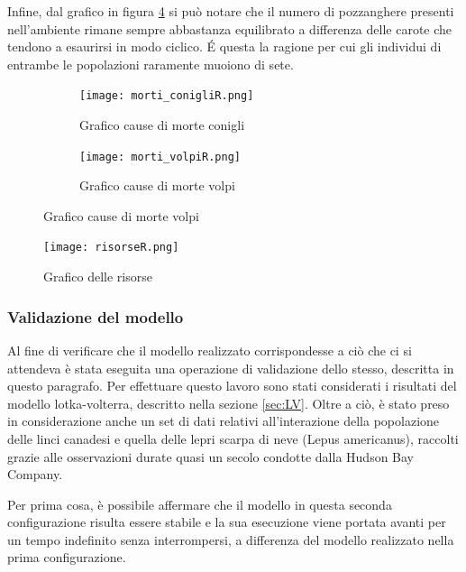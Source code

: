 \documentclass[11pt]{article}
\begin{document}
Infine, dal grafico in figura \ref{fig:risorseReintroduzione} si può notare che il numero di pozzanghere presenti nell'ambiente rimane sempre abbastanza equilibrato a differenza delle carote che tendono a esaurirsi in modo ciclico. É questa la ragione per cui gli individui di entrambe le popolazioni raramente muoiono di sete.

\begin{figure}[h!]
	\hspace{-5mm}
	\begin{subfigure}{.52\textwidth}
         \centering
         \texttt{[image: morti\_conigliR.png]}
         \caption{Grafico cause di morte conigli}
         \label{fig:morteConigliReintroduzione}
	\end{subfigure}
	\begin{subfigure}{.55\textwidth}
		\hspace{12mm}
		\centering
        \texttt{[image: morti\_volpiR.png]}
        \caption{Grafico cause di morte volpi}
        \label{fig:morteVolpiReintroduzione}
	\end{subfigure}
\end{figure}

\begin{figure}[h!]
     \centering
     \texttt{[image: risorseR.png]}
     \caption{Grafico delle risorse}
     \label{fig:risorseReintroduzione}
\end{figure}


\subsubsection{Validazione del modello}
Al fine di verificare che il modello realizzato corrispondesse a ciò che ci si attendeva è stata eseguita una operazione di validazione dello stesso, descritta in questo paragrafo. 
Per effettuare questo lavoro sono stati considerati i risultati del modello lotka-volterra, descritto nella sezione \ref{sec:LV}. Oltre a ciò, è stato preso in considerazione anche un set di dati relativi all'interazione della popolazione delle linci canadesi e quella delle lepri scarpa di neve (Lepus americanus), raccolti grazie alle osservazioni durate quasi un secolo condotte dalla Hudson Bay Company.  

Per prima cosa, è possibile affermare che il modello in questa seconda configurazione risulta essere stabile e la sua esecuzione viene portata avanti per un tempo indefinito senza interrompersi, a differenza del modello realizzato nella prima configurazione.
\end{document}
